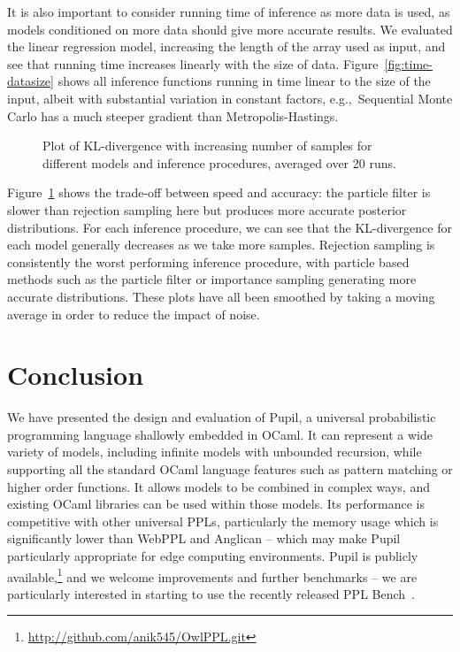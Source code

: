 \documentclass[sigconf]{acmart}
\newcommand{\pupil}{Pupil\xspace}
\begin{document}
It is also important to consider running time of inference as more data is used, as  models conditioned on more data should  give more accurate results. We evaluated  the linear regression model, increasing the length of the array used as input, and see that running time increases linearly with the size of data. Figure~\ref{fig:time-datasize} shows all inference functions running in time linear to the size of the input, albeit with substantial variation in constant factors, e.g.,~Sequential Monte Carlo has a much steeper gradient than Metropolis-Hastings.

\begin{figure}
  \centering
  
  \caption{\label{fig:kl}
    Plot of KL-divergence with increasing number of samples for different models and inference procedures, averaged over 20 runs. %
  }
\end{figure}

Figure~\ref{fig:kl} shows the trade-off between speed and accuracy: the particle filter is slower than rejection sampling here but produces more accurate posterior distributions. For each inference procedure, we can see that the KL-divergence for each model generally decreases as we take more samples. Rejection sampling is consistently the worst performing inference procedure, with particle based methods such as the particle filter or importance sampling generating more accurate distributions. These plots have all been smoothed by taking a moving average in order to reduce the impact of noise.

\section{Conclusion}
\label{s:conclusion}

We have presented the design and evaluation of \pupil, a universal probabilistic programming language shallowly embedded in OCaml. It can represent a wide variety of models, including infinite models with unbounded recursion, while supporting all the standard OCaml language features such as pattern matching or higher order functions. It allows models to be combined in complex ways, and existing OCaml libraries can be used within those models. Its performance is competitive with other universal PPLs, particularly the memory usage which is significantly lower than WebPPL and Anglican -- which may make \pupil particularly appropriate for edge computing environments. \pupil is publicly available,\footnote{\url{http://github.com/anik545/OwlPPL.git}} and we welcome improvements and further benchmarks -- we are particularly interested in starting to use the recently released PPL Bench~\cite{pplbench}.


{
  \clearpage
  
  
}
\end{document}
